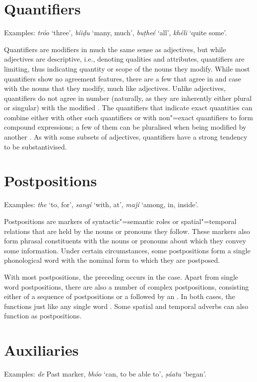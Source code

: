 \section{Quantifiers}
\label{sec:3b-8}
Examples: \textit{tróo} `three', \textit{bíiḍu} `many, much', \textit{buṭheé} `all', \textit{khéli} `quite some'.


Quantifiers are modifiers in much the same sense as adjectives, but while adjectives are descriptive, i.e., denoting qualities and attributes, quantifiers are limiting, thus indicating quantity or scope of the nouns they modify. While most quantifiers show no agreement features, there are a few that agree in  and case with the nouns that they modify, much like adjectives. Unlike adjectives, quantifiers do not agree in number (naturally, as they are inherently either plural or singular) with the modified . The quantifiers that indicate exact quantities can combine either with other such quantifiers or with non"=exact quantifiers to form compound  expressions; a few of them can be pluralised when being modified by another . As with some subsets of adjectives, quantifiers have a strong tendency to be substantivised.


\section{Postpositions}
\label{sec:3b-9}
Examples: \textit{the} `to, for', \textit{sangí} `with, at', \textit{maǰí} `among, in, inside'.


Postpositions are markers of syntactic"=semantic roles or spatial"=temporal relations that are held by the nouns or pronouns they follow. These markers also form phrasal constituents with the nouns or pronouns about which they convey some information. Under certain circumstances, some postpositions form a single phonological word with the nominal form to which they are postposed.  


With most postpositions, the preceding  occurs in the  case. Apart from single word postpositions, there are also a number of complex postpositions, consisting either of a sequence of postpositions or a  followed by an . In both cases, the  functions just like any single word . Some spatial and temporal adverbs can also function as postpositions.


\section{Auxiliaries}
\label{sec:3b-10}
Examples: \textit{de} Past  marker, \textit{bhóo} `can, to be able to', \textit{ṣáatu} `began'.


